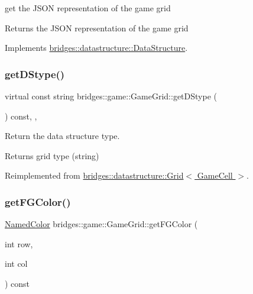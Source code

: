 get the J\+S\+ON representation of the game grid

\begin{DoxyReturn}{Returns}
the J\+S\+ON representation of the game grid 
\end{DoxyReturn}


Implements \hyperlink{classbridges_1_1datastructure_1_1_data_structure}{bridges\+::datastructure\+::\+Data\+Structure}.

\mbox{\label{classbridges_1_1game_1_1_game_grid_a07da19700a077e3d0f2cde2cade2ba60}} 
\subsubsection{\texorpdfstring{get\+D\+Stype()}{getDStype()}}
{\footnotesize\ttfamily virtual const string bridges\+::game\+::\+Game\+Grid\+::get\+D\+Stype (\begin{DoxyParamCaption}{ }\end{DoxyParamCaption}) const\hspace{0.3cm}{\ttfamily [inline]}, {\ttfamily [override]}, {\ttfamily [virtual]}}



Return the data structure type. 

\begin{DoxyReturn}{Returns}
grid type (string) 
\end{DoxyReturn}


Reimplemented from \hyperlink{classbridges_1_1datastructure_1_1_grid_a16aeae38446b96f440dea15f2b19334d}{bridges\+::datastructure\+::\+Grid$<$ Game\+Cell $>$}.

\mbox{\label{classbridges_1_1game_1_1_game_grid_a6d38c8ac0d4ccbdd1b2b1c5d2f445d9a}} 
\subsubsection{\texorpdfstring{get\+F\+G\+Color()}{getFGColor()}}
{\footnotesize\ttfamily \hyperlink{namespacebridges_1_1game_afaa832a4322b25b6a4ebfba832f10f26}{Named\+Color} bridges\+::game\+::\+Game\+Grid\+::get\+F\+G\+Color (\begin{DoxyParamCaption}\item[{int}]{row,  }\item[{int}]{col }\end{DoxyParamCaption}) const\hspace{0.3cm}{\ttfamily [inline]}}

